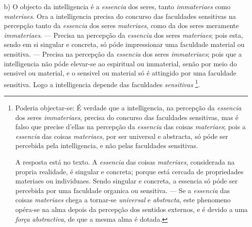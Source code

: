 b) O objecto da intelligencia é a \emph{essencia} dos seres, tanto \emph{immateriaes} como \emph{materiaes}. Ora a intelligencia precisa do concurso das faculdades sensitivas na percepção tanto da \emph{essencia} dos seres \emph{materiaes}, como da dos seres meramente \emph{immateriaes}. --- Precisa na percepção da \emph{essencia} dos seres \emph{materiaes}; pois esta, sendo em si singular e concreta, só póde impressionar uma faculdade material ou sensitiva. --- Precisa na percepção da \emph{essencia} dos seres \emph{immateriaes}; pois que a intelligencia não póde elevar-se ao espiritual ou immaterial, senão por meio do sensivel ou material, e o sensivel ou material só é attingido por uma faculdade sensitiva. Logo a intelligencia depende das faculdades \emph{sensitivas} \footnote{Poderia objectar-se: É verdade que a intelligencia, na percepção da \emph{essencia} dos seres \emph{immateriaes}, precisa do concurso das faculdades sensitivas, mas é falso que precise d'ellas na percepção da \emph{essencia} das coisas \emph{materiaes}; pois a \emph{essencia} das coisas \emph{materiaes}, por ser universal e abstracta, só póde ser percebida pela intelligencia, e não pelas faculdades sensitivas.\par A resposta está no texto. A \emph{essencia} das coisas \emph{materiaes}, considerada na propria realidade, é singular e concreta; porque está cercada de propriedades materiaes ou individuaes. Sendo singular e concreta, a essencia só póde ser percebida por uma faculdade organica ou sensitiva. --- Se a \emph{essencia} das coisas \emph{materiaes} chega a tornar-se \emph{universal} e \emph{abstracta}, este phenomeno opéra-se na alma depois da percepção dos sentidos externos, e é devido a uma \emph{força abstractiva}, de que a mesma alma é dotada.}.

